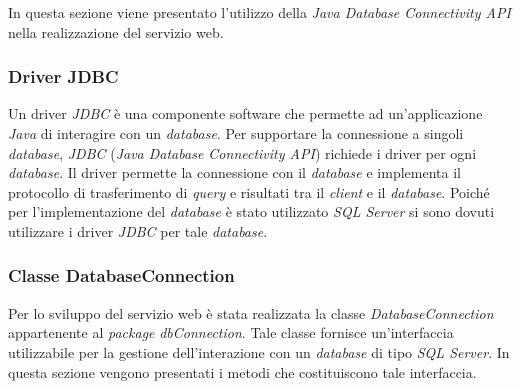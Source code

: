 In questa sezione viene presentato l'utilizzo della \textit{Java Database Connectivity API} nella realizzazione del servizio web.

\subsubsection{Driver JDBC}

Un driver \textit{JDBC} è una componente software che permette ad un'applicazione \textit{Java} di interagire con un \textit{database}. Per supportare la connessione a singoli \textit{database}, \textit{JDBC} (\textit{Java Database Connectivity API}) richiede i driver per ogni \textit{database}. Il driver permette la connessione con il \textit{database} e implementa il protocollo di trasferimento di \textit{query} e risultati tra il \textit{client} e il \textit{database}. Poiché per l'implementazione del \textit{database} è stato utilizzato \textit{SQL Server} si sono dovuti utilizzare i driver \textit{JDBC} per tale \textit{database}.

\subsubsection{Classe DatabaseConnection} \label{dbconnect}

Per lo sviluppo del servizio web è stata realizzata la classe \textit{DatabaseConnection} appartenente al \textit{package} \textit{dbConnection}. Tale classe fornisce un'interfaccia utilizzabile per la gestione dell'interazione con un \textit{database} di tipo \textit{SQL Server}. In questa sezione vengono presentati i metodi che costituiscono tale interfaccia.


